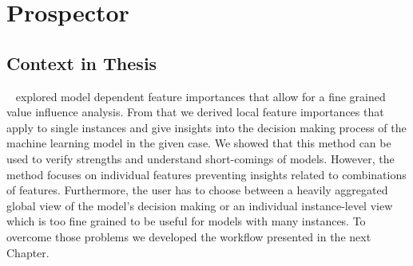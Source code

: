 \chapter{Prospector}
\label{chap:prospector}


\section{Context in Thesis}
\prospector~\cite{prospector16} explored model dependent feature importances that allow for a fine grained value influence analysis.
From that we derived local feature importances that apply to single instances and give insights into the decision making process of the machine learning model in the given case.
We showed that this method can be used to verify strengths and understand short-comings of models.
However, the method focuses on individual features preventing insights related to combinations of features.
Furthermore, the user has to choose between a heavily aggregated global view of the model's decision making or an individual instance-level view which is too fine grained to be useful for models with many instances.
To overcome those problems we developed the workflow presented in the next Chapter.


% 


